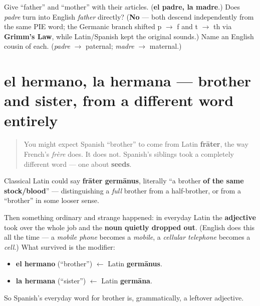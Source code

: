 \begin{tcolorbox}[breakable,colback=teal!4,colframe=teal!35!black,title={Before you move on}]
Give \textquotedblleft{}father\textquotedblright{} and \textquotedblleft{}mother\textquotedblright{} with their articles. (\textbf{el padre, la madre}.) Does \emph{padre} turn into English \emph{father} directly? (\textbf{No} — both descend independently from the same PIE word; the Germanic branch shifted p $\to$ f and t $\to$ th via \textbf{Grimm's Law}, while Latin/Spanish kept the original sounds.) Name an English cousin of each. (\emph{padre} $\to$ paternal; \emph{madre} $\to$ maternal.)
\end{tcolorbox}
\section[el hermano, la hermana]{el hermano, la hermana — brother and sister, from a different word entirely}

\label{lesson:ES-C23-hermano-hermana}



\begin{quote}
You might expect Spanish \textquotedblleft{}brother\textquotedblright{} to come from Latin \textbf{frāter}, the way French's \emph{frère} does. It does not. Spanish's siblings took a completely different word — one about \textbf{seeds}.
\end{quote}

\begin{cousinweb}
Classical Latin could say \textbf{frāter germānus}, literally \textquotedblleft{}a brother \textbf{of the same stock/blood}\textquotedblright{} — distinguishing a \emph{full} brother from a half-brother, or from a \textquotedblleft{}brother\textquotedblright{} in some looser sense.

Then something ordinary and strange happened: in everyday Latin the \textbf{adjective} took over the whole job and the \textbf{noun quietly dropped out}. (English does this all the time — a \emph{mobile phone} becomes a \emph{mobile}, a \emph{cellular telephone} becomes a \emph{cell}.) What survived is the modifier:

\begin{itemize}
\raggedright
  \item \textbf{el hermano} (\textquotedblleft{}brother\textquotedblright{}) $\leftarrow$ Latin \textbf{germānus}.
  \item \textbf{la hermana} (\textquotedblleft{}sister\textquotedblright{}) $\leftarrow$ Latin \textbf{germāna}.
\end{itemize}

So Spanish's everyday word for brother is, grammatically, a leftover adjective.
\end{cousinweb}

